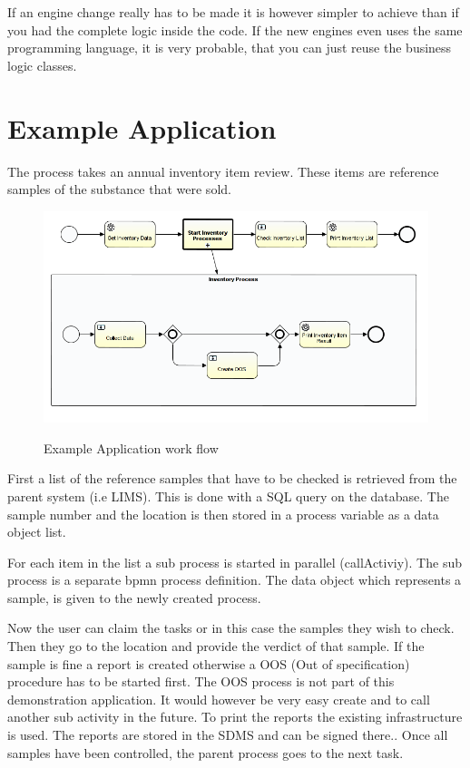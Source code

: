 \documentclass[paper=a4,twoside=false,BCOR=0mm,DIV=calc,fontsize=12pt]{scrartcl}
\begin{document}
If an engine change really has to be made it is however simpler to achieve than if you had the complete logic inside the code. If the new engines even
uses the same programming language, it is very probable, that you can just reuse the business logic classes. 



\section{Example Application}
The process takes an annual inventory item review. These items are reference samples of the substance that were sold.

\begin{figure}
    \begin{center}
      \includegraphics[width=1\textwidth]{./img/PanExampleBPMN.png}\\
    \end{center}
  \caption{Example Application work flow}
  \label{panexampleWorkflow}
\end{figure} 

First a list of the reference samples that have to be checked is retrieved from the parent system (i.e LIMS). This is done with a SQL query on the database. 
The sample number and the location is then stored in a process variable as a data object list.

For each item in the list a sub process is started in parallel (callActiviy). The sub process is a separate bpmn process definition.
The data object which represents a sample, is given to the newly created process.

Now the user can claim the tasks or in this case the samples they wish to check. Then they go to the location and provide the verdict of that sample. If the sample is fine a report is created otherwise a OOS (Out of specification) procedure has to be started first. The OOS process is not part of this demonstration application. It would however be very easy create and to call another sub activity in the future.
To print the reports the existing infrastructure is used. The reports are stored in the SDMS and can be signed there..
Once all samples have been controlled, the parent process goes to the next task.
\end{document}
